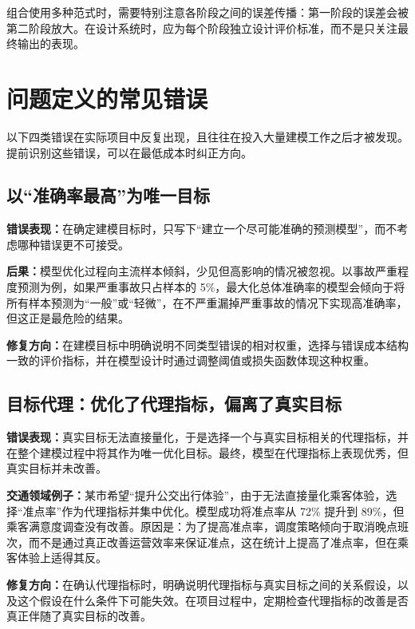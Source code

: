 组合使用多种范式时，需要特别注意各阶段之间的误差传播：第一阶段的误差会被第二阶段放大。在设计系统时，应为每个阶段独立设计评价标准，而不是只关注最终输出的表现。

\section{问题定义的常见错误}

以下四类错误在实际项目中反复出现，且往往在投入大量建模工作之后才被发现。提前识别这些错误，可以在最低成本时纠正方向。

\subsection{以“准确率最高”为唯一目标}

\textbf{错误表现：}在确定建模目标时，只写下“建立一个尽可能准确的预测模型”，而不考虑哪种错误更不可接受。

\textbf{后果：}模型优化过程向主流样本倾斜，少见但高影响的情况被忽视。以事故严重程度预测为例，如果严重事故只占样本的 5\%，最大化总体准确率的模型会倾向于将所有样本预测为“一般”或“轻微”，在不严重漏掉严重事故的情况下实现高准确率，但这正是最危险的结果。

\textbf{修复方向：}在建模目标中明确说明不同类型错误的相对权重，选择与错误成本结构一致的评价指标，并在模型设计时通过调整阈值或损失函数体现这种权重。

\subsection{目标代理：优化了代理指标，偏离了真实目标}

\textbf{错误表现：}真实目标无法直接量化，于是选择一个与真实目标相关的代理指标，并在整个建模过程中将其作为唯一优化目标。最终，模型在代理指标上表现优秀，但真实目标并未改善。

\textbf{交通领域例子：}某市希望“提升公交出行体验”，由于无法直接量化乘客体验，选择“准点率”作为代理指标并集中优化。模型成功将准点率从 72\% 提升到 89\%，但乘客满意度调查没有改善。原因是：为了提高准点率，调度策略倾向于取消晚点班次，而不是通过真正改善运营效率来保证准点，这在统计上提高了准点率，但在乘客体验上适得其反。

\textbf{修复方向：}在确认代理指标时，明确说明代理指标与真实目标之间的关系假设，以及这个假设在什么条件下可能失效。在项目过程中，定期检查代理指标的改善是否真正伴随了真实目标的改善。

